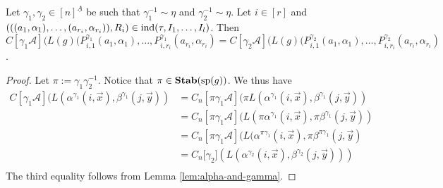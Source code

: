 \documentclass[../main/thesis.tex]{subfiles}
\begin{document}
\begin{lem}
	\label{lem:changing-gamma-on-projections}
  Let $\gamma_1, \gamma_2 \in [n]^{\underline{A}}$ be such that $\gamma^{-1}_1
  \sim \eta$ and $\gamma^{-1}_2 \sim \eta$. Let $i \in [r]$ and $(((a_1,
  \alpha_1), \ldots, (a_{r_i}, \alpha_{r_i})), R_i) \in \text{\upshape ind}(\tau, I_1, \ldots,
  I_l)$. Then $C[\gamma_1 \mathcal{A}] (L(g)(P^{\gamma_1}_{i, 1}(a_1, \alpha_1),
  \ldots, P^{\gamma_1}_{i, {r_i}}(a_{r_i}, \alpha_{r_i}) = C[\gamma_2
  \mathcal{A}] (L(g)(P^{\gamma_2}_{i, 1}(a_1, \alpha_1), \ldots,
  P^{\gamma_2}_{i, {r_i}}(a_{r_i}, \alpha_{r_i})$.
\end{lem}
\begin{proof}
  Let $\pi := \gamma_1 \gamma^{-1}_2$. Notice that $\pi \in \text{\textbf{Stab}} (\text{sp} (g))$. We thus
  have
	\begin{align*}
		C[\gamma_1 \mathcal{A}](L(\alpha^{\gamma_1}(i, \vec{x}), \beta^{\gamma_1}(j,
		\vec{y})) & = C_n[\pi \gamma_1 \mathcal{A}](\pi L(\alpha^{\gamma_1}(i, \vec{x}), 
                \beta^{\gamma_1}(j, \vec{y})) \\
		          & = C_n[\pi \gamma_1 \mathcal{A}](L(\pi                                
                \alpha^{\gamma_1}(i, \vec{x}), \pi \beta^{\gamma_1}(j, \vec{y}))\\
		          & = C_n[\pi                                                            
                \gamma_1 \mathcal{A}](L(\alpha^{\pi \gamma_1}(i, \vec{x}), \pi \beta^{\pi
                \gamma_1}(j, \vec{y})\\
		          & = C_n[\gamma_2 \mathcal] (L(\alpha^{\gamma_2}(i,                     
                \vec{x}), \beta^{\gamma_2}(j, \vec{y})))\\
	\end{align*}The third equality follows from Lemma \ref{lem:alpha-and-gamma}.
\end{proof}
\end{document}
